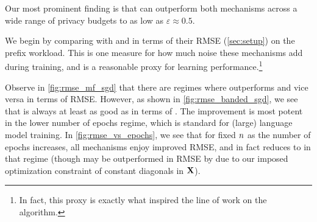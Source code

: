 \documentclass{article}
\begin{document}

 Our most prominent finding is that \BANDMF can outperform both mechanisms across a wide range of privacy budgets to as low as $\varepsilon\approx0.5$.


We begin by comparing \dpsgd with \memf and \BANDMF in terms of their RMSE (\cref{sec:setup}) on the prefix workload.  This is one measure for how much noise these mechanisms add during training, and is a reasonable proxy for learning performance.\footnote{In fact, this proxy is exactly what inspired the line of work on the \DPFTRL algorithm.}



Observe in \cref{fig:rmse_mf_sgd} that there are regimes where \DPSGD outperforms \memf and vice versa in terms of RMSE.  However, as shown in \cref{fig:rmse_banded_sgd}, we see that \BANDMF is always at least as good as \DPSGD in terms of \rmse.  The improvement is most potent in the lower number of epochs regime, which is standard for (large) language model training. In \cref{fig:rmse_vs_epochs}, we see that for fixed $n$ as the number of epochs increases, all mechanisms enjoy improved RMSE, and \BANDMF in fact reduces to \dpsgd in that regime (though \BANDMF may be outperformed in RMSE by \memf due to our imposed optimization constraint of constant diagonals in $\mathbf{X}$).
\end{document}
